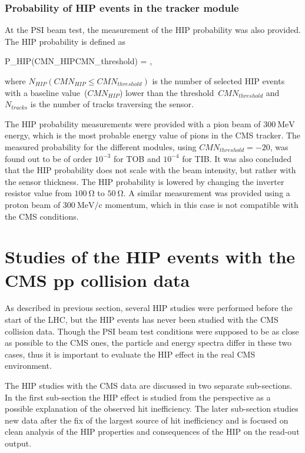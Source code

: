 \subsubsection{Probability of HIP events in the tracker module~\label{sec:ProbPast}}

At the PSI beam test, the measurement of the HIP probability was also provided. The HIP probability is defined as 

{
P_{HIP}(CMN_{HIP}\leq CMN_{threshold}) = ,
}

where $N_{HIP}(CMN_{HIP}\leq CMN_{threshold})$ is the number of selected HIP events with a baseline value~($CMN_{HIP}$) lower than the threshold~$CMN_{threshold}$ and $N_{tracks}$ is the number of tracks traversing the sensor.

The HIP probability measurements were provided with a pion beam of $300~\mathrm{MeV}$ energy, which is the most probable energy value of pions in the CMS tracker. The measured probability for the different modules, using $CMN_{threshold}=-20$, was found out to be of order $10^{-3}$ for TOB and $10^{-4}$ for TIB. It was also concluded that the HIP probability does not scale with the beam intensity, but rather with the sensor thickness. The HIP probability is lowered by changing the inverter resistor value from $100~\mathrm{\Omega}$ to  $50~\mathrm{\Omega}$. A similar measurement was provided using a proton beam of  $300~\mathrm{MeV/c}$ momentum, which in this case is not compatible with the CMS conditions.


\section{Studies of the HIP events with the CMS pp collision data}

As described in previous section, several HIP studies were performed before the start of the LHC, but the HIP events has never been studied with the CMS collision data. Though the PSI beam test conditions were supposed to be as close as possible to the CMS ones, the particle and energy spectra differ in these two cases, thus it is important to evaluate the HIP effect in the real CMS environment.

The HIP studies with the CMS data are discussed in two separate sub-sections. In the first sub-section the HIP effect is studied from the perspective as a possible explanation of the observed hit inefficiency. The later sub-section studies new data after the fix of the largest source of hit inefficiency and is focused on clean analysis of the HIP properties and consequences of the HIP on the read-out output.


